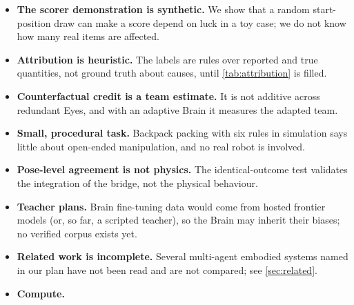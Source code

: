 \begin{itemize}[leftmargin=*,itemsep=1pt]
\item \textbf{The scorer demonstration is synthetic.} We show that a random start-position draw can make a score depend on luck in a toy case; we do not know how many real items are affected.
\item \textbf{Attribution is heuristic.} The labels are rules over reported and true quantities, not ground truth about causes, until \cref{tab:attribution} is filled.
\item \textbf{Counterfactual credit is a team estimate.} It is not additive across redundant Eyes, and with an adaptive Brain it measures the adapted team.
\item \textbf{Small, procedural task.} Backpack packing with six rules in simulation says little about open-ended manipulation, and no real robot is involved.
\item \textbf{Pose-level agreement is not physics.} The identical-outcome test validates the integration of the bridge, not the physical behaviour.
\item \textbf{Teacher plans.} Brain fine-tuning data would come from hosted frontier models (or, so far, a scripted teacher), so the Brain may inherit their biases; no verified corpus exists yet.
\item \textbf{Related work is incomplete.} Several multi-agent embodied systems named in our plan have not been read and are not compared; see \cref{sec:related}.
\item \textbf{Compute.} 
\end{itemize}

